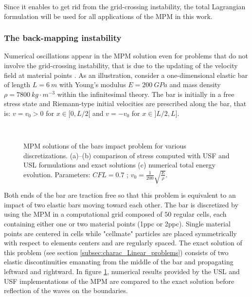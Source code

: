 \begin{remark}
  Since it enables to get rid from the grid-crossing instability, the total Lagrangian formulation will be used for all applications of the MPM in this work.
\end{remark}
\subsubsection*{The back-mapping instability}
Numerical oscillations appear in the MPM solution even for problems that do not involve the grid-crossing instability, that is due to the updating of the velocity field at material points \cite{Mass_Flip}. As an illustration, consider a one-dimensional elastic bar of length $L=6\:m$ with Young's modulus $E=200 \:GPa$ and mass density $\rho=7800 \:kg\cdot m^{-3}$ within the infinitesimal theory. The bar is initially in a free stress state and Riemann-type initial velocities are prescribed along the bar, that is: $v=v_0>0$ for $x\in[0,L/2[$ and $v=-v_0$ for $x \in ]L/2,L]$.
\begin{figure}[ht]
  \centering
  {  \label{subfig:US_diffusion_10}}
  {  \label{subfig:US_diffusion_25}}\\
  {  \label{subfig:US_energies}}
  \caption{MPM solutions of the bars impact problem for various discretizations. (a)--(b) comparison of stress computed with USF and USL formulations and exact solutions (c) numerical total energy evolution. Parameters: $CFL=0.7$ ; $v_0=\frac{1}{200}\sqrt{\frac{E}{\rho}}$.}
  \label{fig:US_diffusion}
\end{figure}
Both ends of the bar are traction free so that this problem is equivalent to an impact of two elastic bars moving toward each other. The bar is discretized by using the MPM in a computational grid composed of $50$ regular cells, each containing either one or two material points (1ppc or 2ppc). Single material points are centered in cells while "cellmate" particles are placed symmetrically with respect to elements centers and are regularly spaced. The exact solution of this problem (see section \ref{subsec:charac_Linear_problems}) consists of two elastic discontinuities emanating from the middle of the bar and propagating leftward and rightward. In figure \ref{fig:US_diffusion}, numerical results provided by the USL and USF implementations of the MPM are compared to the exact solution before reflection of the waves on the boundaries. 

